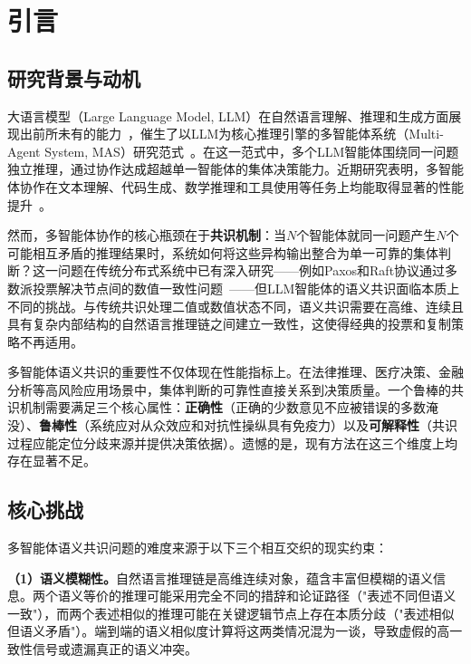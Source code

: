 \documentclass[12pt,a4paper,UTF8,fontset=fandol]{ctexart}
\begin{document}
\section{引言}\label{sec:intro}

\subsection{研究背景与动机}

大语言模型（Large Language Model, LLM）在自然语言理解、推理和生成方面展现出前所未有的能力~\cite{brown2020language,openai2023gpt4}，催生了以LLM为核心推理引擎的多智能体系统（Multi-Agent System, MAS）研究范式~\cite{wooldridge1995intelligent,talebirad2023multi,tran2025multi}。在这一范式中，多个LLM智能体围绕同一问题独立推理，通过协作达成超越单一智能体的集体决策能力。近期研究表明，多智能体协作在文本理解、代码生成、数学推理和工具使用等任务上均能取得显著的性能提升~\cite{chen2023agentverse,hong2023metagpt,wu2023autogen}。

然而，多智能体协作的核心瓶颈在于\textbf{共识机制}：当$N$个智能体就同一问题产生$N$个可能相互矛盾的推理结果时，系统如何将这些异构输出整合为单一可靠的集体判断？这一问题在传统分布式系统中已有深入研究——例如Paxos和Raft协议通过多数派投票解决节点间的数值一致性问题~\cite{olfati2007consensus}——但LLM智能体的语义共识面临本质上不同的挑战。与传统共识处理二值或数值状态不同，语义共识需要在高维、连续且具有复杂内部结构的自然语言推理链之间建立一致性，这使得经典的投票和复制策略不再适用。

多智能体语义共识的重要性不仅体现在性能指标上。在法律推理、医疗决策、金融分析等高风险应用场景中，集体判断的可靠性直接关系到决策质量。一个鲁棒的共识机制需要满足三个核心属性：\textbf{正确性}（正确的少数意见不应被错误的多数淹没）、\textbf{鲁棒性}（系统应对从众效应和对抗性操纵具有免疫力）以及\textbf{可解释性}（共识过程应能定位分歧来源并提供决策依据）。遗憾的是，现有方法在这三个维度上均存在显著不足。

\subsection{核心挑战}

多智能体语义共识问题的难度来源于以下三个相互交织的现实约束：

\textbf{（1）语义模糊性。}自然语言推理链是高维连续对象，蕴含丰富但模糊的语义信息。两个语义等价的推理可能采用完全不同的措辞和论证路径（"表述不同但语义一致"），而两个表述相似的推理可能在关键逻辑节点上存在本质分歧（"表述相似但语义矛盾"）。端到端的语义相似度计算将这两类情况混为一谈，导致虚假的高一致性信号或遗漏真正的语义冲突。
\end{document}
